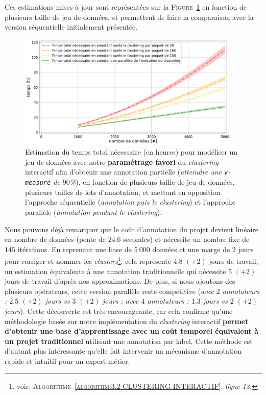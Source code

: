 			Ces estimations mises à jour sont représentées sur la \textsc{Figure~\ref{figure:4.3.4-ETUDE-COUT-TOTAL}} en fonction de plusieurs taille de jeu de données, et permettent de faire la comparaison avec la version séquentielle initialement présentée.
			
			\begin{figure}[!htb]
				\centering
				\includegraphics[width=0.95\textwidth]{figures/etude-temps-total-2-modelisation-parallele}
				\caption{
					Estimation du temps total nécessaire (en heures) pour modéliser un jeu de données avec notre \textbf{paramétrage favori} du \textit{clustering} interactif afin d'obtenir une annotation partielle (\textit{atteindre une \texttt{v-measure} de $90$\%}), en fonction de plusieurs taille de jeu de données, plusieurs tailles de lots d'annotation, et mettant en opposition l'approche séquentielle (\textit{annotation puis le clustering}) et l'approche parallèle (\textit{annotation pendant le clustering}).
				}
				\label{figure:4.3.4-ETUDE-COUT-TOTAL}
			\end{figure}
			
			Nous pouvons déjà remarquer que le coût d'annotation du projet devient linéaire en nombre de données (pente de $24.6$ secondes) et nécessite un nombre fixe de $145$ itérations.
			En reprenant une base de $5~000$ données et une marge de $2$ jours pour corriger et nommer les \textit{clusters}\footnote{voir. \textsc{Algorithme~\ref{algorithm:3.2-CLUSTERING-INTERACTIF}}, \textit{ligne 13}.}, cela représente $4.8$ {\footnotesize $(+2)$} jours de travail, un estimation équivalente à une annotation traditionnelle qui nécessite $5 $ {\footnotesize $(+2)$} jours de travail d'après nos approximations.
			De plus, si nous ajoutons des plusieurs opérateurs, cette version parallèle reste compétitive (\textit{avec $2$ annotateurs : $2.5$ {\footnotesize $(+2)$} jours vs $3$ {\footnotesize $(+2)$} jours ; avec $4$ annotateurs : $1.3$ jours vs $2$ {\footnotesize $(+2)$} jours}).
			Cette découverte est très encourageante, car cela confirme qu'une méthodologie basée sur notre implémentation du \textit{clustering} interactif \textbf{permet d'obtenir une base d'apprentissage avec un coût temporel équivalent à un projet traditionnel} utilisant une annotation par label.
			Cette méthode est d'autant plus intéressante qu'elle fait intervenir un mécanisme d'annotation rapide et intuitif pour un expert métier.
			
